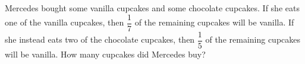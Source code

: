 Mercedes bought some vanilla cupcakes and some chocolate cupcakes. If she eats one of the vanilla cupcakes, then $\dfrac{1}{7}$ of the remaining cupcakes will be vanilla. If she instead eats two of the chocolate cupcakes, then $\dfrac{1}{5}$ of the remaining cupcakes will be vanilla. How many cupcakes did Mercedes buy?
